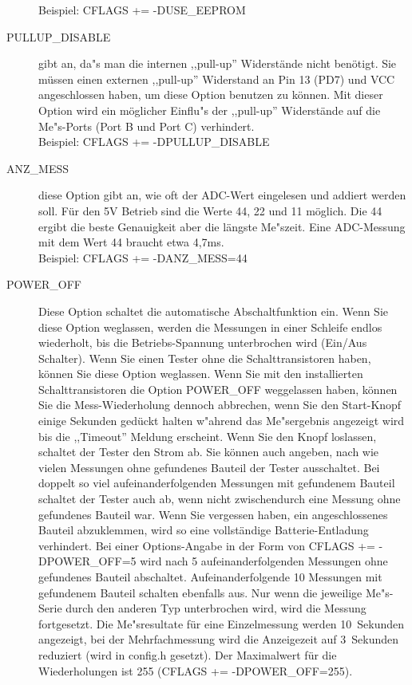 \begin{description}
Beispiel: CFLAGS += -DUSE\_EEPROM
  \item[PULLUP\_DISABLE] gibt an, da"s man die internen ,,pull-up'' Widerst\"ande nicht ben\"otigt.
 Sie m\"ussen einen externen ,,pull-up'' Widerstand an Pin 13 (PD7) und VCC angeschlossen haben, um diese
Option benutzen zu k\"onnen.
Mit dieser Option wird ein m\"oglicher Einflu"s der ,,pull-up'' Widerst\"ande auf die Me"s-Ports (Port B und Port C) verhindert.\\
Beispiel: CFLAGS += -DPULLUP\_DISABLE
  \item[ANZ\_MESS] diese Option gibt an, wie oft der ADC-Wert eingelesen und addiert werden soll.
F\"ur den 5V Betrieb sind die Werte 44, 22 und 11 m\"oglich. Die 44 ergibt die beste Genauigkeit aber die l\"angste Me"szeit.
Eine ADC-Messung mit dem Wert 44 braucht etwa 4,7ms.\\
Beispiel: CFLAGS += -DANZ\_MESS=44
  \item[POWER\_OFF] Diese Option schaltet die automatische Abschaltfunktion ein.
Wenn Sie diese Option weglassen, werden die Messungen in einer Schleife endlos wiederholt, bis die Betriebs-Spannung 
unterbrochen wird (Ein/Aus Schalter).
Wenn Sie einen Tester ohne die Schalttransistoren haben, k\"onnen Sie diese Option weglassen.
Wenn Sie mit den installierten Schalttransistoren die Option POWER\_OFF weggelassen haben,
k\"onnen Sie die Mess-Wiederholung dennoch abbrechen, wenn Sie den Start-Knopf einige Sekunden ged\"uckt halten 
w"ahrend das Me"sergebnis angezeigt wird bis die ,,Timeout'' Meldung erscheint.
Wenn Sie den Knopf loslassen, schaltet der Tester den Strom ab.
Sie k\"onnen auch angeben, nach wie vielen Messungen ohne gefundenes Bauteil der Tester ausschaltet.
Bei doppelt so viel aufeinanderfolgenden Messungen mit gefundenem Bauteil schaltet der Tester auch ab,
wenn nicht zwischendurch eine Messung ohne gefundenes Bauteil war.
Wenn Sie vergessen haben, ein angeschlossenes Bauteil abzuklemmen, wird so eine vollst\"andige Batterie-Entladung
verhindert.
Bei einer Options-Angabe in der Form von CFLAGS += -DPOWER\_OFF=5 wird nach 5 aufeinanderfolgenden Messungen ohne
gefundenes Bauteil abschaltet. Aufeinanderfolgende 10 Messungen mit gefundenem Bauteil schalten ebenfalls aus.
Nur wenn die jeweilige Me"s-Serie durch den anderen Typ unterbrochen wird, wird die Messung fortgesetzt.
Die Me"sresultate f\"ur eine Einzelmessung werden 10~Sekunden angezeigt, bei der Mehrfachmessung wird die
Anzeigezeit auf 3~Sekunden reduziert (wird in config.h gesetzt).
Der Maximalwert f\"ur die Wiederholungen ist 255 (CFLAGS += -DPOWER\_OFF=255).\\

\end{description}

